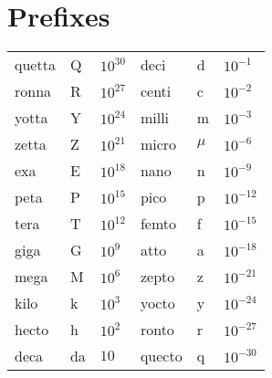 \documentclass[twoside]{report}
\begin{document}
\section*{\center Prefixes}
\begin{center}
\begin{tabular}{||lll|lll||}
\hline
quetta&Q&$10^{30}$&deci  &d &$10^{-1}$\rule{0pt}{11pt}\\
ronna &R&$10^{27}$&centi &c &$10^{-2}$\\
yotta &Y&$10^{24}$&milli &m &$10^{-3}$\\
zetta &Z&$10^{21}$&micro &$\mu$&$10^{-6}$\\
exa   &E&$10^{18}$&nano  &n&$10^{-9}$\\
peta  &P&$10^{15}$&pico  &p&$10^{-12}$\\
tera  &T&$10^{12}$&femto &f&$10^{-15}$\\
giga  &G&$10^9$   &atto  &a&$10^{-18}$\\
mega  &M&$10^6$   &zepto &z&$10^{-21}$\\
kilo  &k&$10^3$   &yocto &y&$10^{-24}$\\
hecto &h&$10^2$   &ronto &r&$10^{-27}$\\
deca  &da&$10 $   &quecto&q&$10^{-30}$\\
\hline
\end{tabular}
\end{center}
\end{document}
